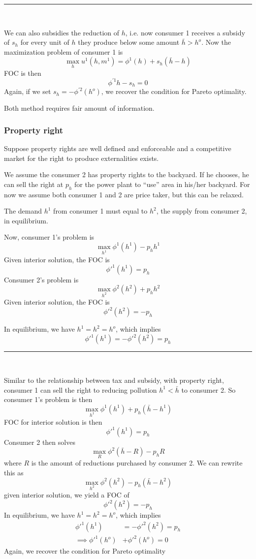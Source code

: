 \documentclass[twocolumn, fleqn]{article}
\begin{document}
		\hrule\
		
		We can also subsidies the reduction of $h$, i.e. now consumer 1 receives a subsidy of $s_h$ for every unit of $h$ they produce below some amount $\bar h > h^o$. Now the maximization problem of consumer 1 is 
		\[ \max_h u^1 (h,m^1)=\phi^1 (h) + s_h(\bar h - h)\]
		FOC is then 
		\[ \phi^{\prime 1}h - s_h =0\]
		Again, if we set $s_h = -\phi^{\prime 2}(h^o)$, we recover the condition for Pareto optimality.
		
		Both method requires fair amount of information. 
		
		\subsubsection{Property right}

		Suppose property rights are well defined and enforceable and a
		competitive market for the right to produce externalities
		exists.
		
		We assume the consumer 2 has property rights to the backyard.
		If he chooses, he can sell the right at $p_h$ for the power plant to
		“use” area in his/her backyard. For now we assume both consumer 1 and 2 are price taker, but this can be relaxed.
		
		The demand $h^1$ from consumer 1 must equal to $h^2$, the supply from consumer 2, in equilibrium.
		
		Now, consumer 1's problem is 
		\[
		\max_{h^1} \phi^1(h^1) - p_h h^1
		\]	
		Given interior solution, the FOC is 	
		\[
		\phi'^1(h^1) = p_h
		\]	
		Consumer 2's problem is 
		\[
		\max_{h^2} \phi^2(h^2) + p_h h^2
		\]
		Given interior solution, the FOC is 
		\[
		\phi'^2(h^2) = -p_h
		\]
		
		In equilibrium, we have $h^1 = h^2 =h^o$, which implies 
		\[\phi'^1(h^1) = - \phi'^2(h^2) = p_h\]
		
		\hrule\
		
		Similar to the relationship between tax and subsidy, with property right, consumer 1 can sell the right to reducing pollution $h^1 < \bar{h}$ to consumer 2. So consumer 1's problem is then
		\[
		\max_{h^1} \phi^1(h^1) + p_h (\bar{h} - h^1)
		\]
		FOC for interior solution is then
		\[
		\phi'^1(h^1) = p_h
		\]
		Consumer 2 then solves
		\[
		\max_{R} \phi^2 (\bar{h} - R) - p_h R
		\]
		where $R$ is the amount of reductions purchased by consumer 2. We can rewrite this as 
		\[
		\max_{h^2} \phi^2 (h^2) - p_h (\bar{h} - h^2)
		\]
		given interior solution, we yield a FOC of 
		\[
		\phi'^2(h^2) = -p_h
		\]
		In equilibrium, we have $h^1 = h^2 =h^o$, which implies 
		\begin{align*}
			\phi'^1(h^1) &= - \phi'^2(h^2) = p_h\\
			\implies \phi'^1(h^o) &+ \phi'^2(h^o)=0
		\end{align*}
		Again, we recover the condition for Pareto optimality
		
\end{document}
